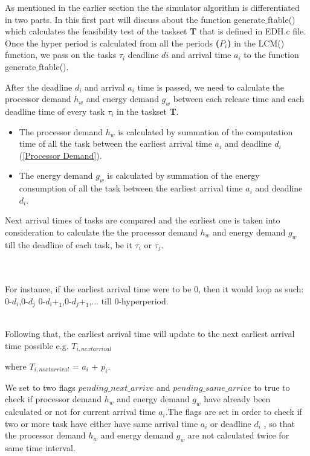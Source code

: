 \documentclass[12pt,hidelinks]{article}
\begin{document}
{As mentioned in the earlier section the the simulator algorithm is differentiated in two parts. In this first part will discuss about the function generate$\_$ftable() which calculates  the feasibility test of the taskset \textbf{T} that is defined in EDH.c file. Once the hyper period is calculated from all the periods \textbf{($P_i$)} in the LCM() function, we pass on the  tasks {$\tau_i$} deadline {$di$} and arrival time  {$a_i$}  to  the function generate$\_$ftable().\newline

After the deadline {$d_i$} and arrival {$a_i$} time is passed, we need to calculate the processor demand \textit{$h_w$} and energy demand \textit{$g_w$} between each release time and each deadline time of every task {$\tau_i$} in the taskset  \textbf{T}.

\begin{itemize}
    \item The processor demand \textit{$h_w$} is calculated by summation of the computation time of all the task between the earliest arrival time {$a_i$} and deadline {$d_i$} (\ref{Processor Demand}).
    \item The energy demand \textit{$g_w$} is calculated by summation of the energy consumption of all the task between the earliest arrival time {$a_i$} and deadline {$d_i$}.
\end{itemize}

Next arrival times of tasks are compared and the earliest one is taken into consideration to calculate the 
the processor demand \textit{$h_w$} and energy demand \textit{$g_w$} till the deadline of each task, be it {$\tau_i$} or {$\tau_j$}.

\\ \\For instance, if the earliest arrival time were to be 0, then it would loop as such: 0-$d_i$,0-$d_j$ 0-$d_i+_1$,0-$d_j+_1$,... till 0-hyperperiod.

\\Following that, the earliest arrival time will update to the next earliest arrival time possible e.g. $T_{i,nextarrival}$

where $T_{i,nextarrival}$ = $a_i$ + $p_i$.\newline

We set to two flags $pending\_next\_arrive$ and $pending\_same\_arrive$ to true to check if processor demand \textit{$h_w$} and energy demand \textit{$g_w$} have already been calculated or not for current arrival time \textbf{$a_i$}.The flags are set in order to check if two or more task have either have same arrival time {$a_i$} or deadline {$d_i$} , so that the processor demand \textit{$h_w$} and energy demand \textit{$g_w$} are not calculated twice for same time interval. \newline

}
\end{document}
